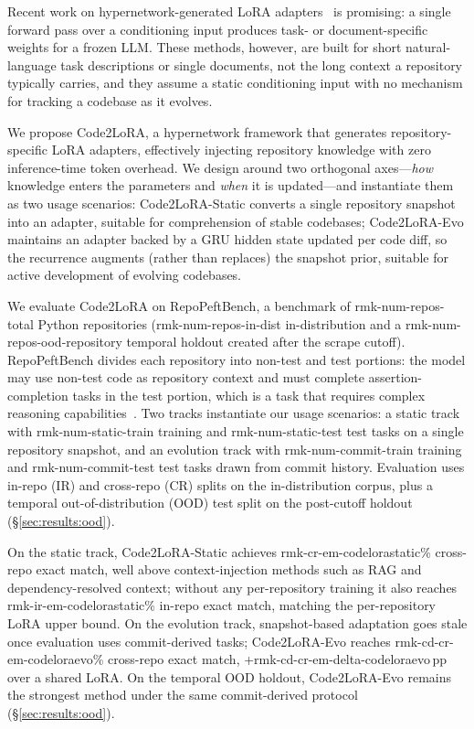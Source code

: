 \documentclass{llmxive}
\providecommand{\UseMacro}[1]{\csname rmk-#1\endcsname}
\providecommand{\codelora}{Code2LoRA\xspace}
\providecommand{\repopeftbench}{RepoPeftBench\xspace}
\providecommand{\codelorastatic}{\codelora-Static\xspace}
\providecommand{\codeloraevo}{\codelora-Evo\xspace}
\begin{document}
Recent work on hypernetwork-generated LoRA adapters~\cite{ha2017hypernetworks,charakorn2025text2lora,charakorn2026doctolora} is promising: a single forward pass over a conditioning input produces task- or document-specific weights for a frozen LLM.
These methods, however, are built for short natural-language task descriptions or single documents, not the long context a repository typically carries, and they assume a static conditioning input with no mechanism for tracking a codebase as it evolves.

We propose \codelora{}, a hypernetwork framework that generates repository-specific LoRA adapters, effectively injecting repository knowledge with zero inference-time token overhead.
We design around two orthogonal axes---\emph{how} knowledge enters the parameters and \emph{when} it is updated---and instantiate them as two usage scenarios:
\codelorastatic{} converts a single repository snapshot into an adapter, suitable for comprehension of stable codebases;
\codeloraevo{} maintains an adapter backed by a GRU hidden state updated per code diff, so the recurrence augments (rather than replaces) the snapshot prior, suitable for active development of evolving codebases.

We evaluate \codelora{} on \repopeftbench{}, a benchmark of \UseMacro{num-repos-total} Python repositories (\UseMacro{num-repos-in-dist} in-distribution and a \UseMacro{num-repos-ood}-repository temporal holdout created after the scrape cutoff).
\repopeftbench{} divides each repository into non-test and test portions: the model may use non-test code as repository context and must complete assertion-completion tasks in the test portion, which is a task that requires complex reasoning capabilities~\cite{jain2025livecodebench}.
Two tracks instantiate our usage scenarios: a static track with \UseMacro{num-static-train} training and \UseMacro{num-static-test} test tasks on a single repository snapshot, and an evolution track with \UseMacro{num-commit-train} training and \UseMacro{num-commit-test} test tasks drawn from commit history.
Evaluation uses in-repo (IR) and cross-repo (CR) splits on the in-distribution corpus, plus a temporal out-of-distribution (OOD) test split on the post-cutoff holdout (\S\ref{sec:results:ood}).

On the static track, \codelorastatic{} achieves \UseMacro{cr-em-codelorastatic}\% cross-repo exact match, well above context-injection methods such as RAG and dependency-resolved context; without any per-repository training it also reaches \UseMacro{ir-em-codelorastatic}\% in-repo exact match, matching the per-repository LoRA upper bound.
On the evolution track, snapshot-based adaptation goes stale once evaluation uses commit-derived tasks; \codeloraevo{} reaches \UseMacro{cd-cr-em-codeloraevo}\% cross-repo exact match, +\UseMacro{cd-cr-em-delta-codeloraevo}\,pp over a shared LoRA.
On the temporal OOD holdout, \codeloraevo{} remains the strongest method under the same commit-derived protocol (\S\ref{sec:results:ood}).
\end{document}

